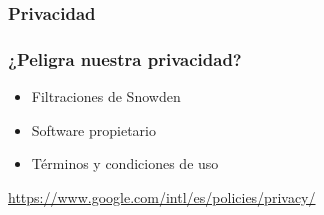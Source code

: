 \documentclass{beamer}
\begin{document}
\begin{frame}\frametitle{Privacidad}


\end{frame}

\begin{frame}\frametitle{¿Peligra nuestra privacidad?}

	\begin{itemize}
		\item Filtraciones de Snowden
		\item Software propietario
		\item Términos y condiciones de uso
	\end{itemize}
\end{frame}

\begin{frame}
	\url{https://www.google.com/intl/es/policies/privacy/}
\end{frame}
\end{document}
